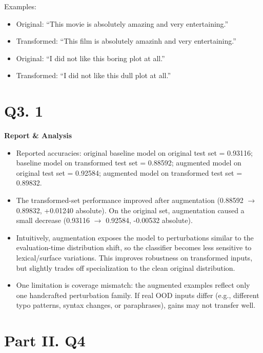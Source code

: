 \documentclass{article}
\begin{document}
Examples:
\begin{itemize}
  \item Original: ``This movie is absolutely amazing and very entertaining.''
  \item Transformed: ``This film is absolutely amazinh and very entertaining.''
  \item Original: ``I did not like this boring plot at all.''
  \item Transformed: ``I did not like this dull plot at all.''
\end{itemize}
\section*{Q3. 1}
\textbf{Report \& Analysis}
\begin{itemize}
  \item Reported accuracies: original baseline model on original test
    set = 0.93116; baseline model on transformed test set = 0.88592;
    augmented model on original test set = 0.92584; augmented model
    on transformed test set = 0.89832.
  \item The transformed-set performance improved after augmentation
    (0.88592 $\rightarrow$ 0.89832, +0.01240 absolute). On the
    original set, augmentation caused a small decrease (0.93116
    $\rightarrow$ 0.92584, -0.00532 absolute).
  \item Intuitively, augmentation exposes the model to perturbations
    similar to the evaluation-time distribution shift, so the
    classifier becomes less sensitive to lexical/surface variations.
    This improves robustness on transformed inputs, but slightly
    trades off specialization to the clean original distribution.
  \item One limitation is coverage mismatch: the augmented examples
    reflect only one handcrafted perturbation family. If real OOD
    inputs differ (e.g., different typo patterns, syntax changes, or
    paraphrases), gains may not transfer well.
\end{itemize}
\section*{Part II. Q4}
%
\end{document}
